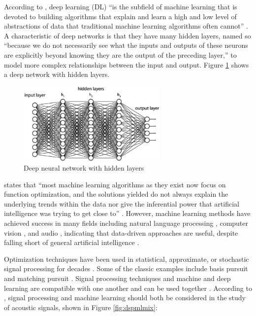 \documentclass[report.tex]{subfiles}
\begin{document}
According to \citeauthor{introtodl}, deep learning (DL) ``is the subfield of machine learning that is devoted to building algorithms that explain and learn a high and low level of abstractions of data that traditional machine learning algorithms often cannot'' \parencite[1]{introtodl}. A characteristic of deep networks is that they have many hidden layers, named so ``because we do not necessarily see what the inputs and outputs of these neurons are explicitly beyond knowing they are the output of the preceding layer,'' \parencite[2]{introtodl} to model more complex relationships between the input and output. Figure \ref{fig:fcdn} shows a deep network with hidden layers.

\begin{figure}[ht]
	\centering
	\includegraphics[width=0.65\textwidth]{./images-neural/dnn.png}
	\caption{Deep neural network with hidden layers \parencite[2]{introtodl}}
	\label{fig:fcdn}
\end{figure}

\citeauthor{introtodl} states that ``most machine learning algorithms as they exist now focus on function optimization, and the solutions yielded do not always explain the underlying trends within the data nor give the inferential power that artificial intelligence was trying to get close to'' \parencite[1]{introtodl}. However, machine learning methods have achieved success in many fields including natural language processing \parencite{nlpml}, computer vision \parencite{cvml}, and audio \parencite{audiodeeplearning}, indicating that data-driven approaches are useful, despite falling short of general artificial intelligence \parencite{generalai}.

Optimization techniques have been used in statistical, approximate, or stochastic signal processing \parencite{stochasticsp, statisticalsp} for decades \parencite{optsp}. Some of the classic examples include basis pursuit and matching pursuit \parencite{dictionary1, dictionary2}. Signal processing techniques and machine and deep learning are compatible with one another and can be used together \parencite{mlsp1, mlsp2}. According to \citeauthor{mldspmix}, signal processing and machine learning should both be considered in the study of acoustic signals, shown in Figure \ref{fig:dspmlmix}:
\end{document}
